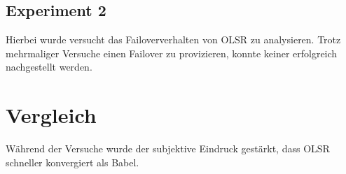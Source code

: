 \documentclass[10pt]{scrartcl}
\begin{document}
	\subsection{Experiment 2}
	Hierbei wurde versucht das Failoververhalten von OLSR zu analysieren. Trotz mehrmaliger Versuche einen Failover zu provizieren, konnte keiner erfolgreich nachgestellt werden.

\section{Vergleich}
Während der Versuche wurde der subjektive Eindruck gestärkt, dass OLSR schneller konvergiert als Babel.

\end{document}
